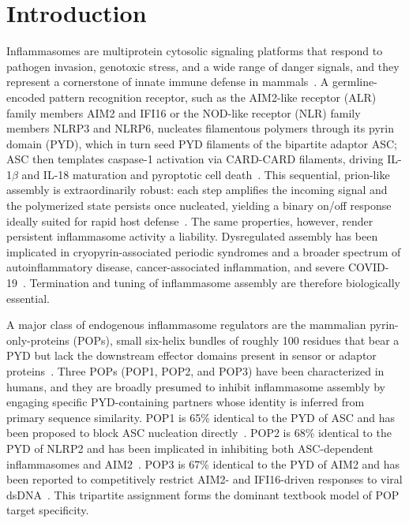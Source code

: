 \section{Introduction}

Inflammasomes are multiprotein cytosolic signaling platforms that respond to pathogen invasion, genotoxic stress, and a wide range of danger signals, and they represent a cornerstone of innate immune defense in mammals~\cite{broz2016inflammasomes,tartey2019inflammasomes}. A germline-encoded pattern recognition receptor, such as the AIM2-like receptor (ALR) family members AIM2 and IFI16 or the NOD-like receptor (NLR) family members NLRP3 and NLRP6, nucleates filamentous polymers through its pyrin domain (PYD), which in turn seed PYD filaments of the bipartite adaptor ASC; ASC then templates caspase-1 activation via CARD-CARD filaments, driving IL-1$\beta$ and IL-18 maturation and pyroptotic cell death~\cite{lu2014unified,hornung2009aim2,fernandesalnemri2009aim2,roberts2009hin200}. This sequential, prion-like assembly is extraordinarily robust: each step amplifies the incoming signal and the polymerized state persists once nucleated, yielding a binary on/off response ideally suited for rapid host defense~\cite{cai2014prion,franklin2014adaptor,matyszewski2018digital}. The same properties, however, render persistent inflammasome activity a liability. Dysregulated assembly has been implicated in cryopyrin-associated periodic syndromes and a broader spectrum of autoinflammatory disease, cancer-associated inflammation, and severe COVID-19~\cite{tartey2019inflammasomes,sharma2018pyrin,vora2021inflammasome,junqueira2022sarscov2}. Termination and tuning of inflammasome assembly are therefore biologically essential.

A major class of endogenous inflammasome regulators are the mammalian pyrin-only-proteins (POPs), small six-helix bundles of roughly 100 residues that bear a PYD but lack the downstream effector domains present in sensor or adaptor proteins~\cite{indramohan2018cops}. Three POPs (POP1, POP2, and POP3) have been characterized in humans, and they are broadly presumed to inhibit inflammasome assembly by engaging specific PYD-containing partners whose identity is inferred from primary sequence similarity. POP1 is 65\% identical to the PYD of ASC and has been proposed to block ASC nucleation directly~\cite{dealmeida2015pyrin}. POP2 is 68\% identical to the PYD of NLRP2 and has been implicated in inhibiting both ASC-dependent inflammasomes and AIM2~\cite{periasamy2017pop2,ratsimandresy2017pop2}. POP3 is 67\% identical to the PYD of AIM2 and has been reported to competitively restrict AIM2- and IFI16-driven responses to viral dsDNA~\cite{khare2014pop3}. This tripartite assignment forms the dominant textbook model of POP target specificity.

